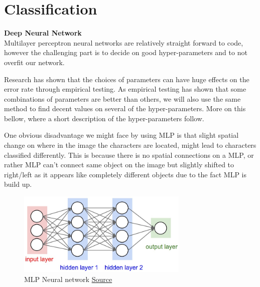 \documentclass[Report.tex]{subfiles}
\begin{document}
\section{Classification}
\label{sec:Discarded Method:Classification}

\begin{flushleft}
  \textbf{Deep Neural Network} \\
  Multilayer perceptron neural networks are relatively straight
  forward to code, however the challenging part is to decide on good hyper-parameters and to not overfit our network. \par
  Research has shown that the choices of parameters can have huge effects on the error rate through empirical testing. As empirical testing has shown that some combinations of parameters are better than others, we will also use the same method to find decent values on several of the hyper-parameters. More on this bellow, where a short description of the hyper-parameters follow. \par
  One obvious disadvantage we might face by using MLP is that slight spatial change on where in the image the characters are located, might lead to characters classified differently. This is because there is no spatial connections on a MLP, or rather MLP can't connect same object on the image but slightly shifted to right/left as it appears like completely different objects due to the fact MLP is build up.
\end{flushleft}

\begin{figure}[H]
  \centering
  \includegraphics[height=4cm]{res/neural_net2.jpeg}
  \caption{MLP Neural network \href{http://cs231n.github.io/neural-networks-1/}{Source}}
  \label{fig:neural_net2}
\end{figure}
\end{document}
